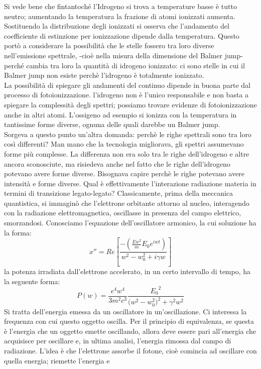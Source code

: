 \documentclass[a4paper,11pt]{article}
\begin{document}
    
    Si vede bene che fintantoché l'Idrogeno si trova a temperature basse è tutto neutro; aumentando la temperatura la frazione di atomi ionizzati aumenta. Sostituendo la distribuzione degli ionizzati si osserva  che l'andamento del coefficiente di estinzione per ionizzazione dipende dalla temperatura. Questo portò a considerare la possibilità che le stelle fossero tra loro diverse nell'emissione spettrale, -cioè nella misura della dimensione del Balmer jump- perché cambia tra loro la quantità di idrogeno ionizzato: ci sono stelle in cui il Balmer jump non esiste perchè l'idrogeno è totalmente ionizzato.\\
    La possibilità di spiegare gli andamenti del continuo dipende in buona parte dal processo di fotoionizzazione. l'idrogeno non è l'unico responsabile e non basta a spiegare la complessità degli spettri; possiamo trovare evidenze di fotoionizzazione anche in altri atomi. L'ossigeno ad esempio si ionizza con la temperatura in tantissime forme diverse, ognuna delle quali darebbe un Balmer jump.\\ Sorgeva a questo punto un'altra domanda: perchè le righe spettrali sono tra loro così differenti? Man mano che la tecnologia migliorava, gli spettri assumevano forme più complesse. La differenza non era solo tra le righe dell'idrogeno e altre ancora sconosciute, ma risiedeva anche nel fatto che le righe dell'idrogeno potevano avere forme diverse. Bisognava capire perchè le righe potevano avere intensità e forme diverse. Qual è effettivamente l'interazione radiazione materia in termini di transizione legato-legato? Classicamente, prima della meccanica quantistica, si immaginò che l'elettrone orbitante attorno al nucleo, interagendo con la radiazione elettromagnetica, oscillasse in presenza del campo elettrico, smorzandosi. Conosciamo l'equazione dell'oscillatore armonico, la cui soluzione ha la forma:
    $$
        x'' = Re[\frac{-(\frac{Ew^2}{m}E_{0}e^{iwt})}{w^2-{w_{0}^2}+i{\gamma}w}]
    $$
    la potenza irradiata dall'elettrone accelerato, in un certo intervallo di tempo, ha la seguente forma: 
    $$
            P(w) = \frac{e^4w^4}{3m^2c^3}\frac{{E_{0}}^2}{(w^2-{w_{0}^2)^2+{\gamma}^2w^2}}
    $$
    $$$$
    Si tratta dell'energia emessa da un oscillatore in un'oscillazione. Ci interessa la frequenza con cui questo oggetto oscilla. Per il principio di equivalenza, se questa è l'energia che un oggetto emette oscillando, allora deve essere pari all'energia che acquisisce per oscillare e, in ultima analisi, l'energia rimossa dal campo di radiazione. L'idea è che l'elettrone assorbe il fotone, cioè comincia ad oscillare con quella energia; riemette l'energia e
\end{document}
